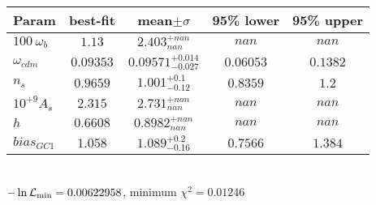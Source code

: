 \begin{tabular}{|l|c|c|c|c|} 
 \hline 
Param & best-fit & mean$\pm\sigma$ & 95\% lower & 95\% upper \\ \hline 
$100~\omega_{b }$ &$1.13$ & $2.403_{nan}^{+nan}$ & $nan$ & $nan$ \\ 
$\omega_{cdm }$ &$0.09353$ & $0.09571_{-0.027}^{+0.014}$ & $0.06053$ & $0.1382$ \\ 
$n_{s }$ &$0.9659$ & $1.001_{-0.12}^{+0.1}$ & $0.8359$ & $1.2$ \\ 
$10^{+9}A_{s }$ &$2.315$ & $2.731_{nan}^{+nan}$ & $nan$ & $nan$ \\ 
$h$ &$0.6608$ & $0.8982_{nan}^{+nan}$ & $nan$ & $nan$ \\ 
$bias_{GC 1 }$ &$1.058$ & $1.089_{-0.16}^{+0.2}$ & $0.7566$ & $1.384$ \\ 
\hline 
 \end{tabular} \\ 
$-\ln{\cal L}_\mathrm{min} =0.00622958$, minimum $\chi^2=0.01246$ \\ 
